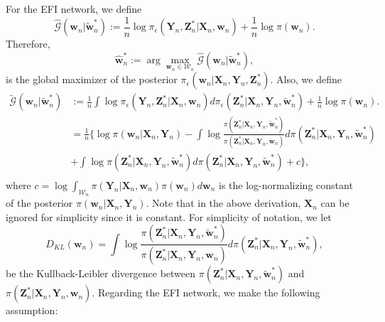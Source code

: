 \documentclass[11pt]{article}
\newcommand{\bX}{{\boldsymbol X}}
\newcommand{\bY}{{\boldsymbol Y}}
\newcommand{\bx}{{\boldsymbol x}}
\newcommand{\bZ}{{\boldsymbol Z}}
\newcommand{\bw}{{\boldsymbol w}}
\newcommand{\mG}{\mathcal{G}}
\newcommand{\btheta}{{\boldsymbol \theta}}
\begin{document}

For the EFI network,  we define 
 \begin{equation} \label{Q1eq}
 \widehat{\mG}(\bw_n|\tilde{\bw}_n^*):=\frac{1}{n} \log\pi_{\epsilon}(\bY_n,\bZ_n^*|\bX_n,\bw_n)+\frac{1}{n} \log \pi(\bw_n). 
 \end{equation}
 Therefore, 
 \[
 \hat{\bw}_n^*:=\arg\max_{\bw_n\in \mathcal{W}_n} \widehat{\mG}(\bw_n|\tilde{\bw}_n^*),
 \]
 is the global maximizer of the posterior $\pi_{\epsilon}(\bw_n|\bX_n,\bY_n,\bZ_n^*)$.
 Also, we define 
 \begin{equation} \label{Q2eq}
 \begin{split}
 \widetilde{\mG}(\bw_n|\tilde{\bw}_n^*)& :=\frac{1}{n}\int \log \pi_{\epsilon}(\bY_n,\bZ_n^*|\bX_n,\bw_n) d\pi_{\epsilon}(\bZ_n^*|\bX_n,\bY_n,\tilde{\bw}_n^*) +\frac{1}{n} \log\pi(\bw_n). \\ 
    &=  \frac{1}{n} \Big\{ \log\pi(\bw_n|\bX_n,\bY_n) - \int \log \frac{\pi(\bZ_n^*|\bX_n,\bY_n,\tilde{\bw}_n^*)}{ \pi(\bZ_n^*|\bX_n,\bY_n,\bw_n)} d \pi(\bZ_n^*|\bX_n,\bY_n,\tilde{\bw}_n^*) \\
    & + \int \log \pi(\bZ_n^*|\bX_n,\bY_n,\tilde{\bw}_n^*) d \pi(\bZ_n^*|\bX_n,\bY_n,\tilde{\bw}_n^*)+c \Big\},\\
 \end{split}
 \end{equation}
   where $c=\log\int_{\mathcal{W}_n} \pi(\bY_n|\bX_n,\bw_n) \pi(\bw_n)d\bw_n$ is the log-normalizing constant of the posterior $\pi(\bw_n|\bX_n,\bY_n)$. Note that in the above derivation, $\bX_n$ can be ignored  for simplicity since it is constant.
   For simplicity of notation, we let 
   \[
 D_{KL}(\bw_n)= \int \log \frac{\pi(\bZ_n^*|\bX_n,\bY_n,\tilde{\bw}_n^*)}{ \pi(\bZ_n^*|\bX_n,\bY_n,\bw_n)} d \pi(\bZ_n^*|\bX_n,\bY_n,\tilde{\bw}_n^*),
 \]
 be the Kullback-Leibler divergence between $\pi(\bZ_n^*|\bX_n,\bY_n,\tilde{\bw}_n^*)$ and $\pi(\bZ_n^*|\bX_n,\bY_n,\bw_n)$. 
Regarding the EFI network, we make the following assumption: 
\end{document}
